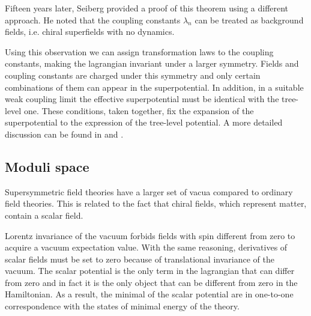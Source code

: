 Fifteen years later, Seiberg \cite{Seiberg:1993vc} provided a proof of this theorem using a different approach.
He noted that the coupling constants $\lambda_n$ can be treated as background fields, i.e. chiral superfields with no dynamics.

Using this observation we can assign transformation laws to the coupling constants, making the lagrangian invariant under a larger symmetry.
Fields and coupling constants are charged under this symmetry and only certain combinations of them can appear in the superpotential.
In addition, in a suitable weak coupling limit the effective superpotential must be identical with the tree-level one.
These conditions, taken together, fix the expansion of the superpotential to the expression of the tree-level potential.
A more detailed discussion can be found in \cite{Seiberg:1994bp} and \cite{Intriligator:1995au}.









\subsection{Moduli space}
Supersymmetric field theories have a larger set of vacua compared to ordinary field theories.
This is related to the fact that chiral fields, which represent matter, contain a scalar field. 

Lorentz invariance of the vacuum forbids fields with spin different from zero to acquire a vacuum expectation value.
With the same reasoning, derivatives of scalar fields must be set to zero because of translational invariance of the vacuum.
The scalar potential is the only term in the lagrangian that can differ from zero and in fact it is the only object that can be different from zero in the Hamiltonian.
As a result, the minimal of the scalar potential are in one-to-one correspondence with the states of minimal energy of the theory.













